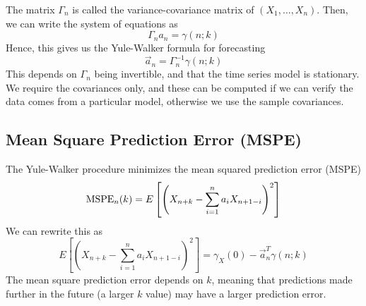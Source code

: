 The matrix $\Gamma_n$ is called the variance-covariance matrix of $(X_1,\ldots,X_n)$. Then, we can write the system of equations as
\[\Gamma_na_n = \gamma(n;k)\]
Hence, this gives us the Yule-Walker formula for forecasting 
\[\vec{a}_n = \Gamma_n^{-1}\gamma(n;k)\]
This depends on $\Gamma_n$ being invertible, and that the time series model is stationary. We require the covariances only, and these can be computed if we can verify the data comes from a particular model, otherwise we use the sample covariances.

\subsection{Mean Square Prediction Error (MSPE)}

The Yule-Walker procedure minimizes the mean squared prediction error (MSPE) 
\[\operatorname{MSPE}_n(k) = E\left[\left(X_{n+k} - \sum_{i=1}^na_iX_{n+1-i}\right)^2\right]\]
We can rewrite this as 
\[E\left[\left(X_{n+k} - \sum_{i=1}^na_iX_{n+1-i}\right)^2\right] = \gamma_X(0) - \vec{a}_n^T \gamma(n;k)\]
The mean square prediction error depends on $k$, meaning that predictions made further in the future (a larger $k$ value) may have a larger prediction error.

